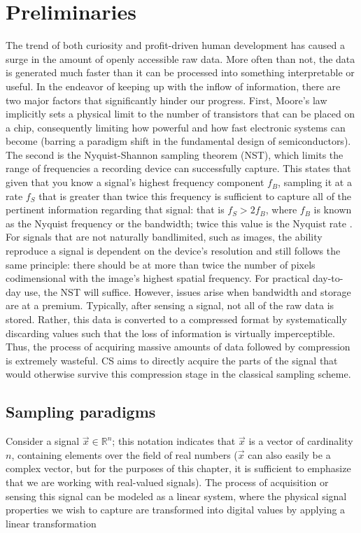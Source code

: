 \chapter{Preliminaries}
\label{chap:theory}

The trend of both curiosity and profit-driven human development has caused a
surge in the amount of openly accessible raw data. More often than not, the data is generated much faster than it can be processed into something interpretable or useful. In the endeavor of keeping up with the inflow of information, there are two major factors that significantly hinder our progress. First, Moore’s law implicitly sets a physical limit to the number of transistors that can be placed on a chip, consequently limiting how powerful and how fast electronic systems can become (barring a paradigm shift in the fundamental design of semiconductors). The second is the Nyquist-Shannon sampling theorem (NST), which limits the range of frequencies a recording device can successfully capture. This states that given that you know a signal's highest frequency component $f_B$, sampling it at a rate $f_S$ that is greater than twice this frequency is sufficient to capture all of the pertinent information regarding that signal: that is $f_S > 2f_B$, where $f_B$ is known as the Nyquist frequency or the bandwidth; twice this value is the Nyquist rate \cite{Shannon1949}. For signals that are not naturally bandlimited, such as images, the ability reproduce a signal is dependent on the device's resolution and still follows the same principle: there should be at more than twice the number of pixels codimensional with the image's highest spatial frequency. For practical day-to-day use, the NST will suffice. However, issues arise when bandwidth and storage are at a premium. Typically, after sensing a signal, not all of the raw data is stored. Rather, this data is converted to a compressed format by systematically discarding values such that the loss of information is virtually imperceptible. Thus, the process of acquiring massive amounts of data followed by compression is extremely wasteful. CS aims to directly acquire the parts of the signal that would otherwise survive this compression stage in the classical sampling scheme.

\section{Sampling paradigms}
\label{sec:sampling}
Consider a signal $\vec{x} \in \mathbb{R}^{n}$; this notation indicates that $\vec{x}$ is a vector of cardinality $n$, containing elements over the field of real numbers ($\vec{x}$ can also easily be a complex vector, but for the purposes of this chapter, it is sufficient to emphasize that we are working with real-valued signals). The process of acquisition or sensing this signal can be modeled as a linear system, where the physical signal properties we wish to capture are transformed into digital values by applying a linear transformation


